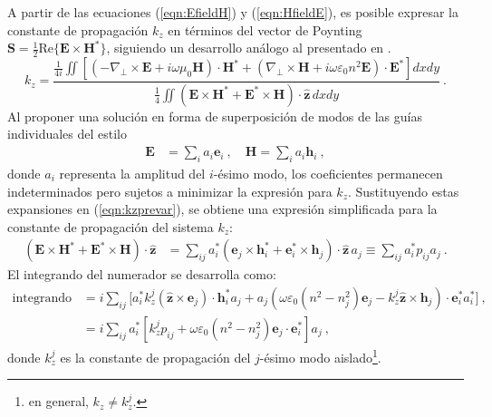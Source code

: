 A partir de las ecuaciones (\ref{eqn:EfieldH}) y (\ref{eqn:HfieldE}), es posible expresar la constante de propagación $k_z$ en términos del vector de Poynting $\textbf{S} = \frac{1}{2} \text{Re}\{\textbf{E} \times \textbf{H}^*\}$, siguiendo un desarrollo análogo al presentado en \citep{haus_coupled-mode}. 
\begin{equation}
	k_z = \frac{
		\frac{1}{4i} \iint \left[
		\left(-\nabla_\perp \times \textbf{E} + i\omega \mu_0 \textbf{H}\right) \cdot \textbf{H}^* 
		+ \left(\nabla_\perp \times \textbf{H} + i\omega \varepsilon_0 n^2 \textbf{E}\right) \cdot \textbf{E}^*
		\right] dxdy
	}{
		\frac{1}{4} \iint \left( 
		\textbf{E} \times \textbf{H}^* + \textbf{E}^* \times \textbf{H}
		\right) \cdot \hat{\textbf{z}} \, dxdy
	} \ . 
	\label{eqn:kzprevar}
\end{equation}
Al proponer una solución en forma de superposición de modos de las guías individuales del estilo
\begin{align*}
	\textbf{E} &= \sum_i a_i \textbf{e}_i \ , \quad \textbf{H} = \sum_i a_i \textbf{h}_i \ ,
\end{align*}
donde $a_i$ representa la amplitud del $i$-ésimo modo, los coeficientes permanecen indeterminados pero sujetos a minimizar la expresión para $k_z$. Sustituyendo estas expansiones en (\ref{eqn:kzprevar}), se obtiene una expresión simplificada para la constante de propagación del sistema $k_z$:
\begin{align*}
	(\textbf{E}\times\textbf{H}^* + \textbf{E}^*\times\textbf{H})\cdot\hat{\textbf{z}} 
	&= \sum_{ij} a_i^* \left( \textbf{e}_j \times \textbf{h}_i^* + \textbf{e}_i^* \times \textbf{h}_j \right) \cdot \hat{\textbf{z}} \, a_j 
	\equiv \sum_{ij} a_i^* p_{ij} a_j \ .
\end{align*}
El integrando del numerador se desarrolla como:
\begin{align*}
	\text{integrando numerador} &= i\sum_{ij} \Big[ a_i^* k_z^j (\hat{\textbf{z}}\times\textbf{e}_j )\cdot\textbf{h}_i^* a_j  + a_j \left(\omega \varepsilon_0 (n^2-n_j^2) \textbf{e}_j - k_z^j \hat{\textbf{z}}\times\textbf{h}_j \right) \cdot \textbf{e}_i^* a_i^* \Big] \ , \\
	&= i\sum_{ij} a_i^* \left[ k_z^j p_{ij} + \omega \varepsilon_0(n^2-n_j^2) \textbf{e}_j \cdot \textbf{e}_i^* \right] a_j \ ,
\end{align*}
donde $k_z^j$ es la constante de propagación del $j$-ésimo modo aislado\footnote{en general, $k_z \neq k_z^j$.}. 

